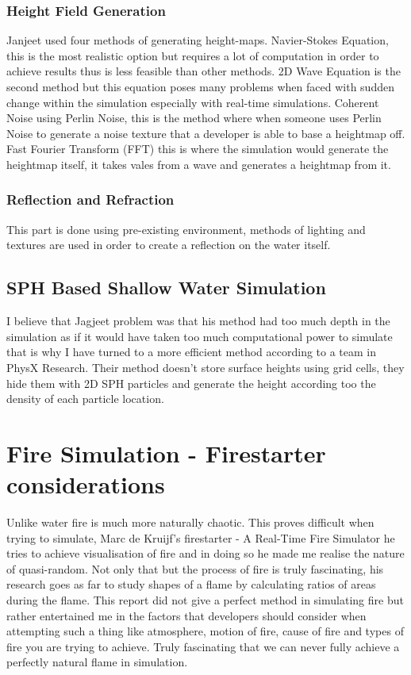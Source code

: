 \documentclass[article, 10pt]{article}
\begin{document}
\subsubsection*{Height Field Generation}

Janjeet used four methods of generating height-maps. Navier-Stokes Equation, this is the most realistic option but requires a lot of computation in order to achieve results thus is less feasible than other methods. 2D Wave Equation is the second method but this equation poses many problems when faced with sudden change within the simulation especially with real-time simulations. Coherent Noise using Perlin Noise, this is the method where when someone uses Perlin Noise to generate a noise texture that a developer is able to base a heightmap off. Fast Fourier Transform (FFT) this is where the simulation would generate the heightmap itself, it takes vales from a wave and generates a heightmap from it.

\subsubsection*{Reflection and Refraction}

This part is done using pre-existing environment, methods of lighting and textures are used in order to create a reflection on the water itself.

\subsection*{SPH Based Shallow Water Simulation}
I believe that Jagjeet problem was that his method had too much depth in the simulation as if it would have taken too much computational power to simulate that is why I have turned to a more efficient method according to a team in PhysX Research. Their method doesn't store surface heights using grid cells, they hide them with 2D SPH particles and generate the height according too the density of each particle location.\cite{solenthaler2011}

\section{Fire Simulation - Firestarter considerations}
Unlike water fire is much more naturally chaotic. This proves difficult when trying to simulate, Marc de Kruijf's firestarter - A Real-Time Fire Simulator \cite{dekruijf} he tries to achieve visualisation of fire and in doing so he made me realise the nature of quasi-random. Not only that but the process of fire is truly fascinating, his research goes as far to study shapes of a flame by calculating ratios of areas during the flame. This report did not give a perfect method in simulating fire but rather entertained me in the factors that developers should consider when attempting such a thing like atmosphere, motion of fire, cause of fire and types of fire you are trying to achieve. Truly fascinating that we can never fully achieve a perfectly natural flame in simulation. 
\end{document}
